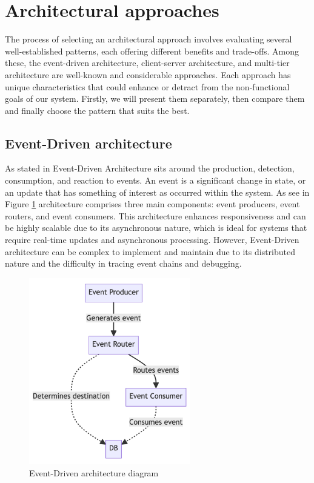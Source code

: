 

\section{Architectural approaches}
The process of selecting an architectural approach involves evaluating several well-established patterns, each offering different benefits and trade-offs. 
Among these, the event-driven architecture, client-server architecture, and multi-tier architecture are well-known and considerable approaches. 
Each approach has unique characteristics that could enhance or detract from the non-functional goals of our system.
Firstly, we will present them separately, then compare them and finally choose the pattern that suits the best.

\subsection{Event-Driven architecture}
As stated in \cite{edaDevto} Event-Driven Architecture sits around the production, detection, consumption, and reaction to events.
An event is a significant change in state, or an update that has something of interest as occurred within the system.
As see in Figure \ref{img03:event_drive_architecture_diagram} architecture comprises three main components: event producers, event routers, and event consumers.
This architecture enhances responsiveness and can be highly scalable due to its asynchronous nature, which is ideal for systems that require real-time updates and asynchronous processing.
However, Event-Driven architecture can be complex to implement and maintain due to its distributed nature and the difficulty in tracing event chains and debugging.
\begin{figure}[H]\centering
\includegraphics[width=70mm]{img/chap03/fig_event_driven_architecture_mermaid.png}
\caption{Event-Driven architecture diagram}
\label{img03:event_drive_architecture_diagram}
\end{figure}


